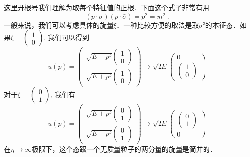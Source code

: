 这里开根号我们理解为取每个特征值的正根．下面这个式子非常有用
\begin{equation}
(p\cdot\sigma)(p\cdot \bar\sigma) = p^2 = m^2~.
\end{equation}
一般来说，我们可以考虑具体的旋量$\xi$．一种比较方便的取法是取$\sigma^3$的本征态．如果$\xi=\begin{pmatrix}
1 \\ 0
\end{pmatrix}$, 我们可以得到
\begin{equation}\label{diracs_eq2}
u(p) = \begin{pmatrix}
\sqrt{E-p^3}\begin{pmatrix}
1 \\ 0 
\end{pmatrix} \\
\sqrt{E+p^3}\begin{pmatrix}
1 \\ 0
\end{pmatrix}
\end{pmatrix} \rightarrow \sqrt{2E}\begin{pmatrix}
0  \\ 
\begin{pmatrix}
1 \\ 0
\end{pmatrix}
\end{pmatrix}
\end{equation}
对于$\xi = \begin{pmatrix}
0 \\ 1
\end{pmatrix}$, 
我们有
\begin{equation}\label{diracs_eq3}
u(p) = \begin{pmatrix}
\sqrt{E+p^3}\begin{pmatrix}
0 \\ 1 
\end{pmatrix} \\
\sqrt{E-p^3}\begin{pmatrix}
0 \\ 1
\end{pmatrix}
\end{pmatrix} \rightarrow \sqrt{2E}\begin{pmatrix}
\begin{pmatrix}
0 \\ 1
\end{pmatrix}  \\ 
0
\end{pmatrix}
\end{equation}
在$\eta\rightarrow \infty$极限下，这个态跟一个无质量粒子的两分量的旋量是简并的．

